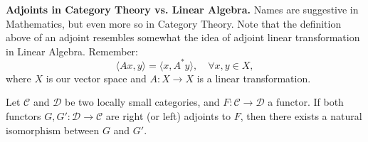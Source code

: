 \begin{shaded}
	\textbf{Adjoints in Category Theory vs. Linear Algebra.} Names are suggestive in Mathematics,
	but even more so in Category Theory. Note that the definition above of an adjoint resembles
	somewhat the idea of adjoint linear transformation in Linear Algebra. Remember:
	\begin{displaymath}
		\langle A x, y \rangle  = \langle x, A^* y \rangle, \quad \forall x,y \in X,
	\end{displaymath}
	where $X$ is our vector space and $A: X \to X$ is a linear transformation.
\end{shaded}

\begin{proposition}
	Let $\mathcal C$ and $\mathcal D$ be two locally small categories, and $F:\mathcal C \to \mathcal D$
	a functor. If both functors $G,G':\mathcal D \to \mathcal C$ are right (or left) adjoints
	to $F$, then there exists a natural isomorphism between $G$ and $G'$.
\end{proposition}
